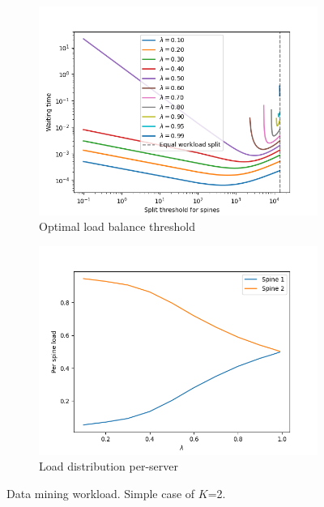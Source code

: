 \\
\begin{figure}
	\centering
	\begin{subfigure}{.5\textwidth}
		\centering
		\includegraphics[width=.99\linewidth]{Chapter3/Figures/equal_workload_split_bpdm}
		\caption{Optimal load balance threshold}
		\label{fig:cost-dm}
	\end{subfigure}%
	\begin{subfigure}{.5\textwidth}
		\centering
		\includegraphics[width=.99\linewidth]{Chapter3/Figures/per_spine_load_bpdm}
		\caption{Load distribution per-server }
		\label{fig:perspineload-dm}
	\end{subfigure}
	\caption{Data mining workload. Simple case of $K$=2.}
	\label{fig:lbthreshold-dm}
\end{figure}
